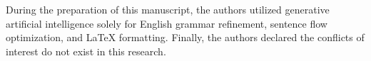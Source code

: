 \documentclass[conference]{IEEEtran}
\begin{document}
During the preparation of this manuscript, the authors utilized generative artificial intelligence solely for English grammar refinement, sentence flow optimization, and LaTeX formatting. Finally, the authors declared the conflicts of interest do not exist in this research. 



{\scriptsize
\renewcommand{\baselinestretch}{0.88}\selectfont


}
\end{document}
